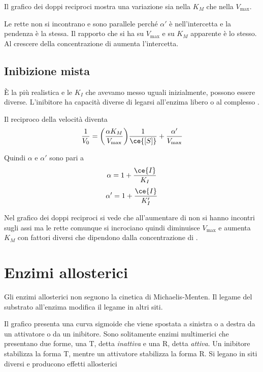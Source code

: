 Il grafico dei doppi reciproci mostra una variazione sia nella $K_M$ che nella $V_{\text{max}}$.

Le rette non si incontrano e sono parallele perché $\alpha'$ è nell’intercetta e la pendenza è la stessa.
Il rapporto che si ha su $V_{\text{max}}$ e su $K_M$ apparente è lo stesso. Al crescere della concentrazione di  aumenta l’intercetta.

\subsection{Inibizione mista}

È la più realistica e le $K_I$ che avevamo messo uguali inizialmente, possono essere diverse.
L’inibitore ha capacità diverse di legarsi all’enzima libero o al complesso .


Il reciproco della velocità diventa
\[
\frac{1}{V_0} = \biggl(\frac{\alpha K_M}{V_{\text{max}}} \biggr) \frac{1}{\ce{[S]}} + \frac{\alpha'}{V_{\text{max}}}
\]

Quindi $\alpha$ e $\alpha'$ sono pari a
\[
    \alpha = 1 + \frac{\ce{I}}{K_I} 
\]
\[
    \alpha' = 1 + \frac{\ce{I}}{K_I'}
\]

Nel grafico dei doppi reciproci si vede che all’aumentare di  non si hanno incontri
sugli assi ma le rette comunque si incrociano quindi diminuisce $V_{\text{max}}$ e aumenta $K_M$
con fattori \alpha{} diversi che dipendono dalla concentrazione di .



\begin{fullpaper}
\end{fullpaper}

\section{Enzimi allosterici}

Gli enzimi allosterici non seguono la cinetica di Michaelis-Menten. Il legame del substrato all'enzima modifica il legame in altri siti.

Il grafico presenta una curva sigmoide che viene spostata a sinistra o a destra da un attivatore o da un inibitore. Sono solitamente enzimi multimerici che presentano due forme, una T, detta \emph{inattiva} e una R, detta \emph{attiva}. Un inibitore stabilizza la forma T, mentre un attivatore stabilizza la forma R. Si legano in siti diversi e producono effetti allosterici

